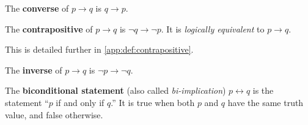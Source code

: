 \begin{table}[h]
  \centering
  \caption{Other ways of writing the conditional statement \(p \to q\).}
  \label{tab:conditionals}
\end{table}
\begin{defn} 
  The \textbf{converse} of \(p \to q\) is \(q \to p\).
\end{defn}
\begin{defn} \label{def:contrapositive}
  The \textbf{contrapositive} of \(p \to q\) is \(\neg q \to \neg p\). It is
  \emph{logically equivalent} to \(p \to q\).

  This is detailed further in \ref{app:def:contrapositive}.
\end{defn}
\begin{defn} 
  The \textbf{inverse} of \(p \to q\) is \(\neg p \to \neg q\).
\end{defn}
\begin{defn} 
  The \textbf{biconditional statement} (also called \emph{bi-implication}) \(p \leftrightarrow q\) is the statement
  ``\(p\) if and only if \(q\).''
  It is true when both \(p\) and \(q\) have the same truth value, and false otherwise.
\end{defn}
\begin{table}[h]
  \centering
  \caption{Other ways of writing the biconditional statement \(p \leftrightarrow q\).}
  \label{tab:biconditionals}
\end{table}

